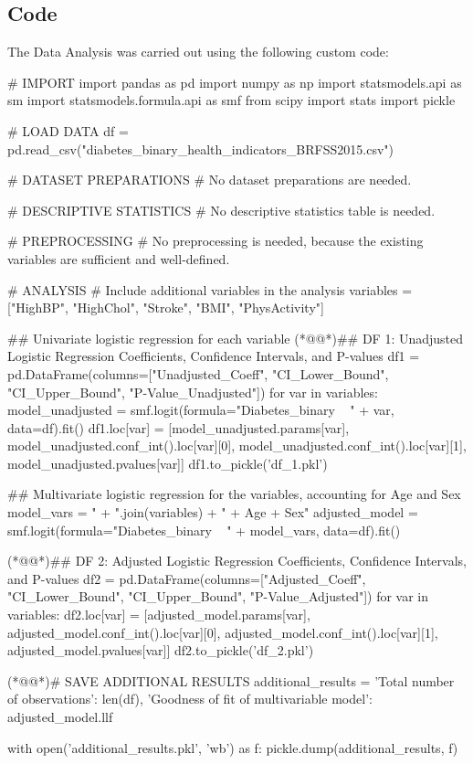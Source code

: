 \documentclass[11pt]{article}
\begin{document}
\subsection{{Code}}
The Data Analysis was carried out using the following custom code:

\begin{python}

# IMPORT
import pandas as pd
import numpy as np
import statsmodels.api as sm
import statsmodels.formula.api as smf
from scipy import stats
import pickle

# LOAD DATA
df = pd.read_csv("diabetes_binary_health_indicators_BRFSS2015.csv")

# DATASET PREPARATIONS
# No dataset preparations are needed.

# DESCRIPTIVE STATISTICS
# No descriptive statistics table is needed.

# PREPROCESSING
# No preprocessing is needed, because the existing variables are sufficient and well-defined.

# ANALYSIS
# Include additional variables in the analysis
variables = ["HighBP", "HighChol", "Stroke", "BMI", "PhysActivity"]

## Univariate logistic regression for each variable
(*@@*)## DF 1: Unadjusted Logistic Regression Coefficients, Confidence Intervals, and P-values 
df1 = pd.DataFrame(columns=["Unadjusted_Coeff", "CI_Lower_Bound", "CI_Upper_Bound", "P-Value_Unadjusted"])
for var in variables:
    model_unadjusted = smf.logit(formula="Diabetes_binary ~ " + var, data=df).fit()
    df1.loc[var] = [model_unadjusted.params[var], model_unadjusted.conf_int().loc[var][0], model_unadjusted.conf_int().loc[var][1], model_unadjusted.pvalues[var]]
df1.to_pickle('df_1.pkl')

## Multivariate logistic regression for the variables, accounting for Age and Sex
model_vars = " + ".join(variables) + " + Age + Sex"
adjusted_model = smf.logit(formula="Diabetes_binary ~ " + model_vars, data=df).fit()

(*@@*)## DF 2: Adjusted Logistic Regression Coefficients, Confidence Intervals, and P-values
df2 = pd.DataFrame(columns=["Adjusted_Coeff", "CI_Lower_Bound", "CI_Upper_Bound", "P-Value_Adjusted"])
for var in variables:
    df2.loc[var] = [adjusted_model.params[var], adjusted_model.conf_int().loc[var][0], adjusted_model.conf_int().loc[var][1], adjusted_model.pvalues[var]]
df2.to_pickle('df_2.pkl')

(*@@*)# SAVE ADDITIONAL RESULTS
additional_results = {
    'Total number of observations': len(df), 
    'Goodness of fit of multivariable model': adjusted_model.llf
}

with open('additional_results.pkl', 'wb') as f:
    pickle.dump(additional_results, f)  

\end{python}
\end{document}
